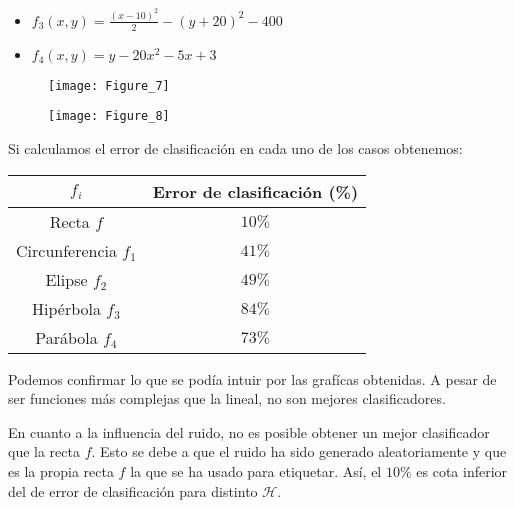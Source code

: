 \begin{multicols}{2}
\begin{itemize}
\item $f_3(x,y) = \frac{(x - 10)^2}{2} - (y + 20)^2 - 400$
\item $f_4(x,y) = y - 20x^2 - 5x + 3$
\end{itemize}
\end{multicols}

\begin{figure}[H]
  \begin{minipage}[b]{.5\linewidth}
    \centering
    \texttt{[image: Figure\_7]}
    \label{subfig-3:dummy}
  \end{minipage}
  \hfill \hfill
  \begin{minipage}[b]{.5\linewidth}
    \centering
    \texttt{[image: Figure\_8]}
    \label{subfig-4:dummy}
  \end{minipage}
  \label{fig:dummy2}
\end{figure}

Si calculamos el error de clasificación en cada uno de los casos obtenemos:

\begin{table}[!ht]
    \centering
    \begin{tabular}{cc}
    \toprule
        $f_i$ & Error de clasificación (\%) \\ \midrule
        Recta $f$            & $10\%$ \\
        Circunferencia $f_1$ & $41\%$  \\ 
        Elipse $f_2$         & $49\%$  \\
        Hipérbola $f_3$      & $84\%$  \\
        Parábola $f_4$       & $73\%$ \\ \bottomrule
    \end{tabular}
\end{table}

Podemos confirmar lo que se podía intuir por las grafícas obtenidas.
A pesar de ser funciones más complejas que la lineal, no son mejores
clasificadores. 

En cuanto a la influencia del ruido, no es posible obtener un mejor
clasificador que la recta $f$. Esto se debe a que el ruido ha sido generado
aleatoriamente y que es la propia recta $f$ la que se ha usado para
etiquetar. Así, el $10\%$ es cota inferior del de error de clasificación para
distinto $\mathcal{H}$.

